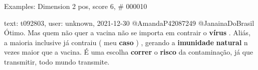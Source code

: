 \begin{frame}{Examples: Dimension 2 pos, score 6, \# 000010}
\footnotesize
\begin{exampleblock}{text: t092803, user: unknown, 2021-12-30}
@AmandaP42087249 @JanainaDoBrasil Ótimo. Mas quem não quer a vacina não se 
importa em contrair o \textbf{vírus} . Aliás, a maioria inclusive já contraiu ( 
meu \textbf{caso} ) , gerando a \textbf{imunidade} \textbf{natural} n vezes 
maior que a vacina. É uma escolha \textbf{correr} o \textbf{risco} da 
contaminação, já que transmitir, todo mundo transmite. 
\end{exampleblock}
\end{frame}
